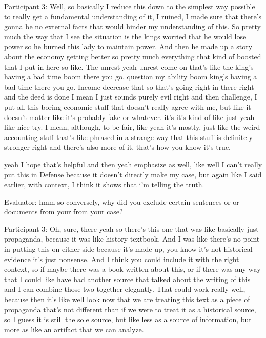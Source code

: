 \documentclass{l4proj}
\begin{document}
\begin{appendices}
Participant 3: Well, so basically I reduce this down to the simplest way possible to really get a fundamental understanding of it, I ruined, I made sure that there's gonna be no external facts that would hinder my understanding of this. So pretty much the way that I see the situation is the kings worried that he would lose power so he burned this lady to maintain power. And then he made up a story about the economy getting better so pretty much everything that kind of boosted that I put in here so like. The unrest yeah unrest come on that's like the king’s having a bad time boom there you go, question my ability boom king’s having a bad time there you go. Income decrease that so that's going right in there right and the deed is done I mean I just sounds purely evil right and then challenge, I put all this boring economic stuff that doesn't really agree with me, but like it doesn't matter like it's probably fake or whatever. it's it's kind of like just yeah like nice try. I mean, although, to be fair, like yeah it's mostly, just like the weird accounting stuff that's like phrased in a strange way that this stuff is definitely stronger right and there's also more of it, that’s how you know it's true. 

yeah I hope that's helpful and then yeah emphasize as well, like well I can't really put this in Defense because it doesn't directly make my case, but again like I said earlier, with context, I think it shows that i'm telling the truth.
 
 


Evaluator: hmm so conversely, why did you exclude certain sentences or or documents from your from your case?

Participant 3: Oh, sure, there yeah so there's this one that was like basically just propaganda, because it was like history textbook. And I was like there's no point in putting this on either side because it's made up, you know it's not historical evidence it's just nonsense. And I think you could include it with the right context, so if maybe there was a book written about this, or if there was any way that I could like have had another source that talked about the writing of this and I can combine those two together elegantly. That could work really well, because then it's like well look now that we are treating this text as a piece of propaganda that's not different than if we were to treat it as a historical source, so I guess it is still the sole source, but like less as a source of information, but more as like an artifact that we can analyze.


\end{appendices}
\end{document}
